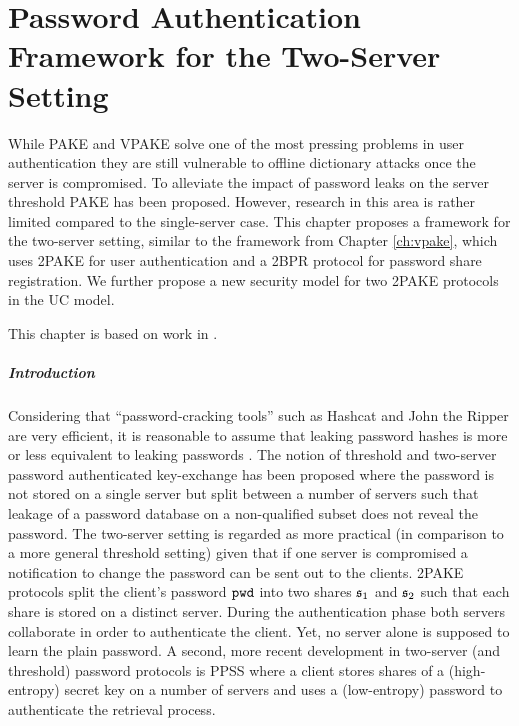 \chapter{Password Authentication Framework for the Two-Server Setting} \label{ch:2pake}

While \ac{PAKE} and \ac{VPAKE} solve one of the most pressing problems in user authentication they are still vulnerable to offline dictionary attacks once the server is compromised.
To alleviate the impact of password leaks on the server threshold \ac{PAKE} has been proposed.
However, research in this area is rather limited compared to the single-server case.
This chapter proposes a framework for the two-server setting, similar to the framework from Chapter \ref{ch:vpake}, which uses \ac{2PAKE} for user authentication and a \ac{2BPR} protocol for password share registration.
We further propose a new security model for two \ac{2PAKE} protocols in the \ac{UC} model.

This chapter is based on work in \cite{KieferM14b,KieferM15b,KieferM15c}.

\paragraph{Introduction}

Considering that ``password-cracking tools'' such as Hashcat \cite{hashcat} and John the Ripper \cite{JohnTheRipper} are very efficient, it is reasonable to assume that leaking password hashes is more or less equivalent to leaking passwords \cite{NarayananS05a,WeirAMG09,DellAmicoMR10,Bonneau12}.
The notion of threshold and two-server password authenticated key-exchange \cite{FordK00,MacKenzieSJ02} has been proposed where the password is not stored on a single server but split between a number of servers such that leakage of a password database on a non-qualified subset does not reveal the password.
The two-server setting is regarded as more practical (in comparison to a more general threshold setting) given that if one server is compromised a notification to change the password can be sent out to the clients.
\ac{2PAKE} protocols \cite{BrainardJKS03,SzydloK05,Katz2012a} split the client's password $\mathtt{pwd}$ into two shares $\mathfrak{s}_1$ and $\mathfrak{s}_2$ such that each share is stored on a distinct server.
During the authentication phase both servers collaborate in order to authenticate the client.
Yet, no server alone is supposed to learn the plain password.
A second, more recent development in two-server (and threshold) password protocols is \ac{PPSS} \cite{Bagherzandi2011,Camenisch2012,JareckiKK14} where a client stores shares of a (high-entropy) secret key on a number of servers and uses a (low-entropy) password to authenticate the retrieval process.

